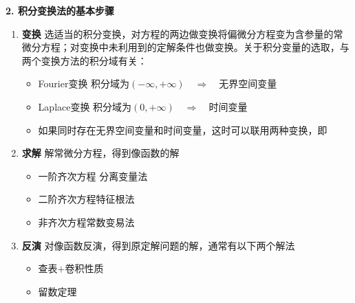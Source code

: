 \noindent \textbf{2. 积分变换法的基本步骤}
\begin{enumerate}
	\item \textbf{变换} \quad 选适当的积分变换，对方程的两边做变换将偏微分方程变为含参量的常微分方程；对变换中未利用到的定解条件也做变换。关于积分变量的选取，与两个变换方法的积分域有关：
	\begin{itemize}
		\item Fourier变换 \quad 积分域为$(-\infty, + \infty) \quad \Rightarrow \quad$无界空间变量
		\item Laplace变换 \quad 积分域为$(0, +\infty) \quad \Rightarrow \quad$时间变量
		\item 如果同时存在无界空间变量和时间变量，这时可以联用两种变换，即
	\end{itemize}
	\item \textbf{求解} \quad 解常微分方程，得到像函数的解
	\begin{itemize}
		\item 一阶齐次方程 \quad 分离变量法
		\item 二阶齐次方程\quad 特征根法
		\item 非齐次方程\quad 常数变易法
	\end{itemize}
	\item \textbf{反演} \quad 对像函数反演，得到原定解问题的解，通常有以下两个解法
	\begin{itemize}
		\item 查表$+$卷积性质
		\item 留数定理
	\end{itemize}
\end{enumerate}
\vspace*{-1em}


